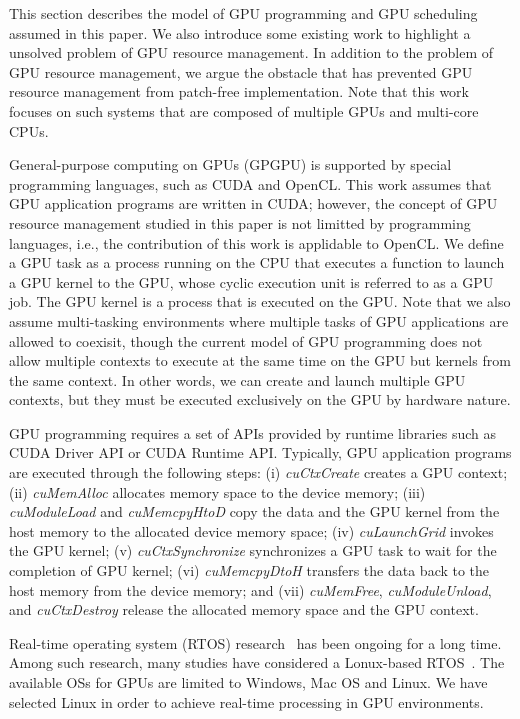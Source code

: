 \label{sec:system_model}
This section describes the model of GPU programming and GPU scheduling
assumed in this paper.
We also introduce some existing work to highlight a unsolved problem of
GPU resource management.
In addition to the problem of GPU resource management, we argue the
obstacle that has prevented GPU resource management from patch-free
implementation. 
Note that this work focuses on such systems that are composed of
multiple GPUs and multi-core CPUs.

General-purpose computing on GPUs (GPGPU) is supported by special
programming languages, such as CUDA and OpenCL.
This work assumes that GPU application programs are written in CUDA;
however, the concept of GPU resource management studied in this paper is
not limitted by programming languages, i.e., the contribution of this
work is applidable to OpenCL.
We define a GPU task as a process running on the CPU that executes a
function to launch a GPU kernel to the GPU, whose cyclic execution unit
is referred to as a GPU job.
The GPU kernel is a process that is executed on the GPU. 
Note that we also assume multi-tasking environments where multiple tasks
of GPU applications are allowed to coexisit, though the current model of
GPU programming does not allow multiple contexts to execute at the same
time on the GPU but kernels from the same context.
In other words, we can create and launch multiple GPU contexts, but they
must be executed exclusively on the GPU by hardware nature.

GPU programming requires a set of APIs provided by runtime libraries
such as CUDA Driver API or CUDA Runtime API.
Typically, GPU application programs are executed through the following
steps:
(i) \textit{cuCtxCreate} creates a GPU context;
(ii) \textit{cuMemAlloc} allocates memory space to the device memory; 
(iii) \textit{cuModuleLoad} and \textit{cuMemcpyHtoD} copy the data and
the GPU kernel from the host memory to the allocated device memory
space;
(iv) \textit{cuLaunchGrid} invokes the GPU kernel;
(v) \textit{cuCtxSynchronize} synchronizes a GPU task to wait for the
completion of GPU kernel;
(vi) \textit{cuMemcpyDtoH} transfers the data back to the host memory
from the device memory; and
(vii) \textit{cuMemFree}, \textit{cuModuleUnload}, and \textit{cuCtxDestroy} release the allocated memory space and the GPU context.

Real-time operating system (RTOS) research~\cite{spring,redline,itron,rk} has been ongoing for a long time.
Among such research, many studies have considered a Lonux-based RTOS~\cite{litmus,prk,rtai,yodaiken1999rtlinux,kato2009loadable}.
The available OSs for GPUs are limited to Windows, Mac OS and Linux.
We have selected Linux in order to achieve real-time processing in GPU environments.

